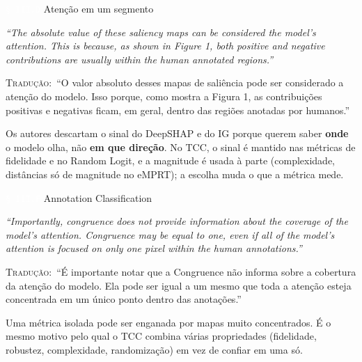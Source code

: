\documentclass[11pt,a4paper]{article}
\newcommand{\pagechip}[1]{{\setlength{\fboxsep}{1.5pt}\colorbox{cAcc}{\textcolor{white}{\scriptsize\texttt{#1}}}}}
\newenvironment{origquote}{\par\itshape\small}{\par}
\newenvironment{tradquote}{\par\small\textsc{Tradução:}\ }{\par}
\newcommand{\explab}[1]{\par\smallskip{\small\color{cAcc}\textbf{\MakeUppercase{#1}}}\par}
\begin{document}
\begin{citacard}{\pagechip{§ III.D} Atenção em um segmento}
\begin{origquote}“The absolute value of these saliency maps can be considered the model’s attention. This is because, as shown in Figure 1, both positive and negative contributions are usually within the human annotated regions.”\end{origquote}
\begin{tradquote}“O valor absoluto desses mapas de saliência pode ser considerado a atenção do modelo. Isso porque, como mostra a Figura 1, as contribuições positivas e negativas ficam, em geral, dentro das regiões anotadas por humanos.”\end{tradquote}
\explab{Explicação}
Os autores descartam o sinal do DeepSHAP e do IG porque querem saber \textbf{onde} o modelo olha, não \textbf{em que direção}. No TCC, o sinal é mantido nas métricas de fidelidade e no Random Logit, e a magnitude é usada à parte (complexidade, distâncias só de magnitude no eMPRT); a escolha muda o que a métrica mede.
\end{citacard}

\begin{citacard}{\pagechip{§ III.F} Annotation Classification}
\begin{origquote}“Importantly, congruence does not provide information about the coverage of the model’s attention. Congruence may be equal to one, even if all of the model’s attention is focused on only one pixel within the human annotations.”\end{origquote}
\begin{tradquote}“É importante notar que a Congruence não informa sobre a cobertura da atenção do modelo. Ela pode ser igual a um mesmo que toda a atenção esteja concentrada em um único ponto dentro das anotações.”\end{tradquote}
\explab{Explicação}
Uma métrica isolada pode ser enganada por mapas muito concentrados. É o mesmo motivo pelo qual o TCC combina várias propriedades (fidelidade, robustez, complexidade, randomização) em vez de confiar em uma só.
\end{citacard}
\end{document}
